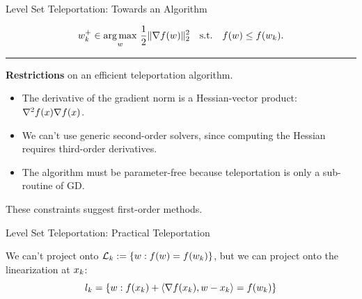 \documentclass[usenames,dvipsnames,mathserif,notheorems]{beamer}
\newcommand{\horizontalrule}{
	{
			\vspace{-0.5em}
			\center \rule{\textwidth}{0.1em}
			\vspace{-0.2em}
		}
}
\newcommand{\bad}[1]{\textcolor{bad}{#1}}
\newcommand{\good}[1]{\textcolor{good}{#1}}
\begin{document}
\begin{frame}{Level Set Teleportation: Towards an Algorithm}

    \[
        w_k^+ \in \mathop{\rm arg\,max}_w \, \frac 1 2 \|\nabla f(w)\|^2_2  \quad \text{s.t.} \quad f(w) \leq f(w_k).
    \]

    \horizontalrule
    \pause

    \textbf{Restrictions} on an efficient teleportation algorithm.

    \vspace{1ex}

    \begin{itemize}
        \item The derivative of the gradient norm is a
              \bad{Hessian-vector product}: \( \nabla^2 f(x) \nabla f(x) \).
              \pause
              \vspace{1ex}

        \item We can't use generic second-order solvers, since computing the
              Hessian requires
              \bad{third-order derivatives}.

              \pause
              \vspace{1ex}
        \item The algorithm must be \good{parameter-free} because
              teleportation is only a sub-routine of GD.
    \end{itemize}
    \pause
    \vspace{1ex}

    These constraints suggest \good{first-order methods}.

\end{frame}

\begin{frame}{Level Set Teleportation: Practical Teleportation}

    We can't project onto \( \mathcal{L}_k := \left\{w : f(w) = f(w_k)\right\} \),
    but we can project onto the \good{linearization} at \( x_k \):
    \[
        l_k = \left\{ w : f(x_k) + \left\langle\nabla f(x_k), w - x_k\right\rangle = f(w_k) \right\}
    \]
    \pause
    \vspace{-4ex}

    \begin{center}
        
    \end{center}

\end{frame}
\end{document}
